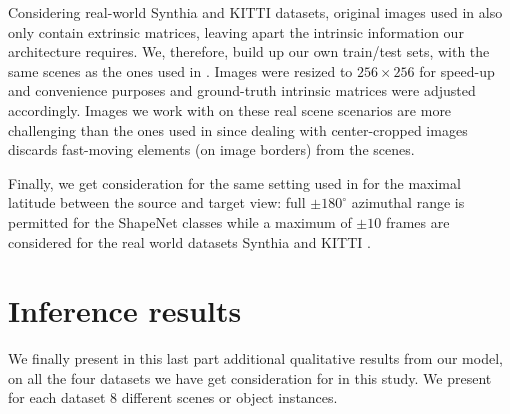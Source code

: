 Considering real-world Synthia \citep{ros2016synthia} and KITTI \citep{geiger2012we} datasets, original images used in \citep{kim2020novel} also only contain extrinsic matrices, leaving apart the intrinsic information our architecture requires. We, therefore, build up our own train/test sets, with the same scenes as the ones used in \citep{kim2020novel}. Images were resized to $256\times256$ for speed-up and convenience purposes and ground-truth intrinsic matrices were adjusted accordingly. Images we work with on these real scene scenarios are more challenging than the ones used in \citep{kim2020novel,sun2018multiview} since dealing with center-cropped images discards fast-moving elements (on image borders) from the scenes.

Finally, we get consideration for the same setting used in \citep{kim2020novel} for the maximal latitude between the source and target view: full $\pm 180^{\circ}$ azimuthal range is permitted for the ShapeNet classes while a maximum of $\pm 10$ frames are considered for the real world datasets Synthia \citep{ros2016synthia} and KITTI \citep{geiger2012we}.

\section{Inference results}
We finally present in this last part additional qualitative results from our model, on all the four datasets we have get consideration for in this study. We present for each dataset 8 different scenes or object instances. 

